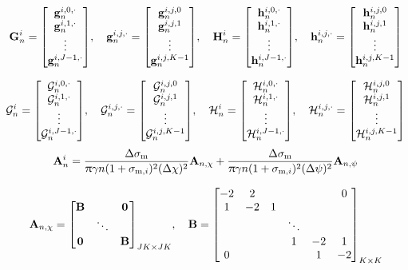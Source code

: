\documentclass{article}
\begin{document}
$$
\vb{G}_n^i = \mqty[\vb{g}_n^{i,0,\cdot}\\ \vb{g}_n^{i,1,\cdot}\\ \vdots\\
\vb{g}_n^{i,J-1,\cdot}]
\qc 
\vb{g}_n^{i,j,\cdot} = \mqty[\vb{g}_n^{i,j,0}\\ \vb{g}_n^{i,j,1}\\ \vdots\\
\vb{g}_n^{i,j,K-1}]
\qc
\vb{H}_n^i = \mqty[\vb{h}_n^{i,0,\cdot}\\ \vb{h}_n^{i,1,\cdot}\\ \vdots\\
\vb{h}_n^{i,J-1,\cdot}]
\qc 
\vb{h}_n^{i,j,\cdot} = \mqty[\vb{h}_n^{i,j,0}\\ \vb{h}_n^{i,j,1}\\ \vdots\\
\vb{h}_n^{i,j,K-1}]
$$

$$
\mathcal{G}_n^i = \mqty[\mathcal{G}_n^{i,0,\cdot}\\ \mathcal{G}_n^{i,1,\cdot}\\ \vdots\\
\mathcal{G}_n^{i,J-1,\cdot}]
\qc 
\mathcal{G}_n^{i,j,\cdot} = \mqty[\mathcal{G}_n^{i,j,0}\\ \mathcal{G}_n^{i,j,1}\\ \vdots\\
\mathcal{G}_n^{i,j,K-1}]
\qc
\mathcal{H}_n^i = \mqty[\mathcal{H}_n^{i,0,\cdot}\\ \mathcal{H}_n^{i,1,\cdot}\\ \vdots\\
\mathcal{H}_n^{i,J-1,\cdot}]
\qc 
\mathcal{H}_n^{i,j,\cdot} = \mqty[\mathcal{H}_n^{i,j,0}\\ \mathcal{H}_n^{i,j,1}\\ \vdots\\
\mathcal{H}_n^{i,j,K-1}]
$$
$$
\vb{A}_n^i 
= 
\frac{\Delta\sigma_\text{m}}{\uppi \gamma n (1+\sigma_{\mathrm{m}
,i})^2(\Delta\chi)^2} \vb{A}_{n,\chi}
+
\frac{\Delta\sigma_\text{m}}{\uppi \gamma n (1+\sigma_{\mathrm{m}
,i})^2(\Delta\psi)^2} \vb{A}_{n,\psi}
$$

$$
\vb{A}_{n,\chi} 
=
\mqty[\vb{B}& &\vb{0}\\  &\ddots &\\ \vb{0}& &\vb{B}]_{JK \times JK}
\qc
\vb{B} = \mqty[-2&2&&&&0 \\ 1&-2&1 \\&&&\ddots \\&&&1&-2&1\\0 &&&&1&-2]_{
K\times K}
$$
\end{document}
